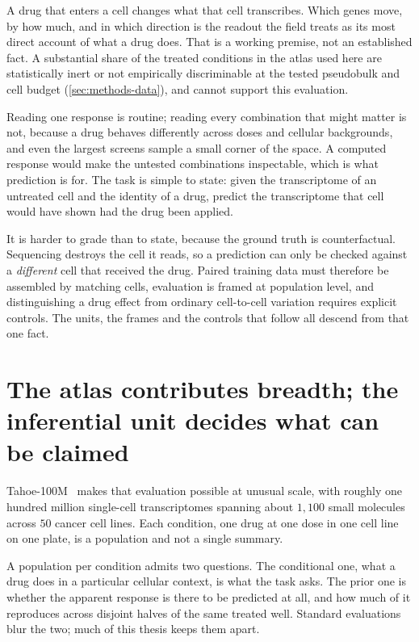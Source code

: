A drug that enters a cell changes what that cell transcribes. Which genes move,
by how much, and in which direction is the readout the field treats as its most
direct account of what a drug does. That is a working premise, not an
established fact. A substantial share of the treated conditions in the atlas
used here are statistically inert or not empirically discriminable at the tested
pseudobulk and cell budget (\cref{sec:methods-data}), and cannot support this
evaluation.

Reading one response is routine; reading every combination that might matter is
not, because a drug behaves differently across doses and cellular backgrounds,
and even the largest screens sample a small corner of the space. A computed
response would make the untested combinations inspectable, which is what
prediction is for. The task is simple to state: given the transcriptome of an
untreated cell and the identity of a drug, predict the transcriptome that cell
would have shown had the drug been applied.

It is harder to grade than to state, because the ground truth is
counterfactual. Sequencing destroys the cell it reads, so a prediction can only
be checked against a \emph{different} cell that received the drug. Paired
training data must therefore be assembled by matching cells, evaluation is
framed at population level, and distinguishing a drug effect from ordinary
cell-to-cell variation requires explicit controls. The units, the frames and
the controls that follow all descend from that one fact.

\section{The atlas contributes breadth; the inferential unit decides what can be
claimed}
\label{sec:intro-atlas}

Tahoe-100M~\cite{tahoe100m} makes that evaluation possible at unusual scale,
with roughly one hundred million single-cell transcriptomes spanning about
$1{,}100$ small molecules across $50$ cancer cell lines. Each condition, one
drug at one dose in one cell line on one plate, is a population and not a
single summary.

A population per condition admits two questions. The conditional one, what a
drug does in a particular cellular context, is what the task asks. The prior one
is whether the apparent response is there to be predicted at all, and how much
of it reproduces across disjoint halves of the same treated well. Standard
evaluations blur the two; much of this thesis keeps them apart.


